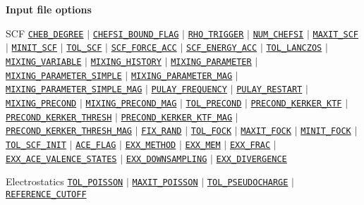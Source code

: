 \begin{frame}[allowframebreaks]{\textbf{Input file options}}
  \begin{block}{SCF}
  \hyperlink{CHEB_DEGREE}{\texttt{CHEB\_DEGREE}} $\vert$
  \hyperlink{CHEFSI_BOUND_FLAG}{\texttt{CHEFSI\_BOUND\_FLAG}} $\vert$
  \hyperlink{RHO_TRIGGER}{\texttt{RHO\_TRIGGER}} $\vert$
  \hyperlink{NUM_CHEFSI}{\texttt{NUM\_CHEFSI}} $\vert$
  \hyperlink{MAXIT_SCF}{\texttt{MAXIT\_SCF}} $\vert$
  \hyperlink{MINIT_SCF}{\texttt{MINIT\_SCF}} $\vert$
  \hyperlink{TOL_SCF}{\texttt{TOL\_SCF}} $\vert$
  \hyperlink{SCF_FORCE_ACC}{\texttt{SCF\_FORCE\_ACC}} $\vert$
  \hyperlink{SCF_ENERGY_ACC}{\texttt{SCF\_ENERGY\_ACC}} $\vert$
  \hyperlink{TOL_LANCZOS}{\texttt{TOL\_LANCZOS}} $\vert$
  \hyperlink{MIXING_VARIABLE}{\texttt{MIXING\_VARIABLE}} $\vert$
  \hyperlink{MIXING_HISTORY}{\texttt{MIXING\_HISTORY}} $\vert$
  \hyperlink{MIXING_PARAMETER}{\texttt{MIXING\_PARAMETER}} $\vert$
  \hyperlink{MIXING_PARAMETER_SIMPLE}{\texttt{MIXING\_PARAMETER\_SIMPLE}} $\vert$
  \hyperlink{MIXING_PARAMETER_MAG}{\texttt{MIXING\_PARAMETER\_MAG}} $\vert$
  \hyperlink{MIXING_PARAMETER_SIMPLE_MAG}{\texttt{MIXING\_PARAMETER\_SIMPLE\_MAG}} $\vert$
  \hyperlink{PULAY_FREQUENCY}{\texttt{PULAY\_FREQUENCY}} $\vert$
  \hyperlink{PULAY_RESTART}{\texttt{PULAY\_RESTART}} $\vert$
  \hyperlink{MIXING_PRECOND}{\texttt{MIXING\_PRECOND}} $\vert$
  \hyperlink{MIXING_PRECOND_MAG}{\texttt{MIXING\_PRECOND\_MAG}} $\vert$
  \hyperlink{TOL_PRECOND}{\texttt{TOL\_PRECOND}} $\vert$
  \hyperlink{PRECOND_KERKER_KTF}{\texttt{PRECOND\_KERKER\_KTF}} $\vert$
  \hyperlink{PRECOND_KERKER_THRESH}{\texttt{PRECOND\_KERKER\_THRESH}} $\vert$
  \hyperlink{PRECOND_KERKER_KTF_MAG}{\texttt{PRECOND\_KERKER\_KTF\_MAG}} $\vert$
  \hyperlink{PRECOND_KERKER_THRESH_MAG}{\texttt{PRECOND\_KERKER\_THRESH\_MAG}} $\vert$
  \hyperlink{FIX_RAND}{\texttt{FIX\_RAND}} $\vert$ 
  \hyperlink{TOL_FOCK}{\texttt{TOL\_FOCK}} $\vert$ 
  \hyperlink{MAXIT_FOCK}{\texttt{MAXIT\_FOCK}} $\vert$ 
  \hyperlink{MINIT_FOCK}{\texttt{MINIT\_FOCK}} $\vert$ 
  \hyperlink{TOL_SCF_INIT}{\texttt{TOL\_SCF\_INIT}} $\vert$ 
  \hyperlink{ACE_FLAG}{\texttt{ACE\_FLAG}} $\vert$ 
  \hyperlink{EXX_METHOD}{\texttt{EXX\_METHOD}} $\vert$ 
  \hyperlink{EXX_MEM}{\texttt{EXX\_MEM}} $\vert$ 
  \hyperlink{EXX_FRAC}{\texttt{EXX\_FRAC}} $\vert$ 
  \hyperlink{EXX_ACE_VALENCE_STATES}{\texttt{EXX\_ACE\_VALENCE\_STATES}} $\vert$ 
  \hyperlink{EXX_DOWNSAMPLING}{\texttt{EXX\_DOWNSAMPLING}} $\vert$ 
  \hyperlink{EXX_DIVERGENCE}{\texttt{EXX\_DIVERGENCE}}
  \end{block}
  
  \vspace{-2mm}
  \begin{block}{Electrostatics}
  \hyperlink{TOL_POISSON}{\texttt{TOL\_POISSON}} $\vert$
  \hyperlink{MAXIT_POISSON}{\texttt{MAXIT\_POISSON}} $\vert$
  \hyperlink{TOL_PSEUDOCHARGE}{\texttt{TOL\_PSEUDOCHARGE}} $\vert$
  \hyperlink{REFERENCE_CUTOFF}{\texttt{REFERENCE\_CUTOFF}} 
  \end{block}
  

\end{frame}
